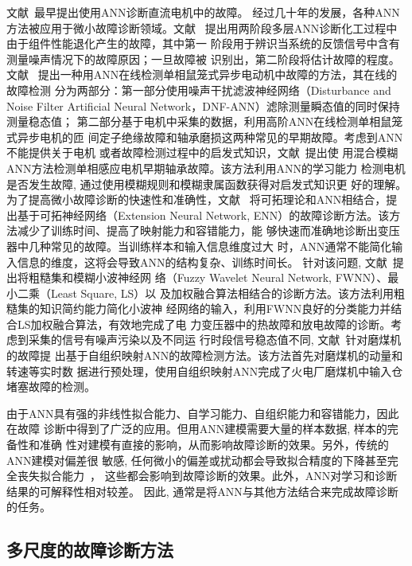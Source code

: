 文献~最早提出使用ANN诊断直流电机中的故障。
经过几十年的发展，各种ANN方法被应用于微小故障诊断领域。文献~
提出用两阶段多层ANN诊断化工过程中由于组件性能退化产生的故障，其中第一
阶段用于辨识当系统的反馈信号中含有测量噪声情况下的故障原因；一旦故障被
识别出，第二阶段将估计故障的程度。文献~
提出一种用ANN在线检测单相鼠笼式异步电动机中故障的方法，其在线的故障检测
分为两部分：第一部分使用噪声干扰滤波神经网络（Disturbance and Noise Filter
Artificial Neural Network，DNF-ANN）滤除测量瞬态值的同时保持测量稳态值；
第二部分基于电机中采集的数据，利用高阶ANN在线检测单相鼠笼式异步电机的匝
间定子绝缘故障和轴承磨损这两种常见的早期故障。考虑到ANN不能提供关于电机
或者故障检测过程中的启发式知识，文献~提出使
用混合模糊ANN方法检测单相感应电机早期轴承故障。该方法利用ANN的学习能力
检测电机是否发生故障, 通过使用模糊规则和模糊隶属函数获得对启发式知识更
好的理解。为了提高微小故障诊断的快速性和准确性，文献~
将可拓理论和ANN相结合，提出基于可拓神经网络（Extension Neural Network,
ENN）的故障诊断方法。该方法减少了训练时间、提高了映射能力和容错能力，能
够快速而准确地诊断出变压器中几种常见的故障。当训练样本和输入信息维度过大
时，ANN通常不能简化输入信息的维度，这将会导致ANN的结构复杂、训练时间长。
针对该问题, 文献~提出将粗糙集和模糊小波神经网
络（Fuzzy Wavelet Neural Network, FWNN）、最小二乘（Least Square, LS）以
及加权融合算法相结合的诊断方法。该方法利用粗糙集的知识简约能力简化小波神
经网络的输入，利用FWNN良好的分类能力并结合LS加权融合算法，有效地完成了电
力变压器中的热故障和放电故障的诊断。考虑到采集的信号有噪声污染以及不同运
行时段信号稳态值不同, 文献~针对磨煤机的故障提
出基于自组织映射ANN的故障检测方法。该方法首先对磨煤机的动量和转速等实时数
据进行预处理，使用自组织映射ANN完成了火电厂磨煤机中输入仓堵塞故障的检测。

由于ANN具有强的非线性拟合能力、自学习能力、自组织能力和容错能力，因此在故障
诊断中得到了广泛的应用。但用ANN建模需要大量的样本数据, 样本的完备性和准确
性对建模有直接的影响，从而影响故障诊断的效果。另外，传统的ANN建模对偏差很
敏感, 任何微小的偏差或扰动都会导致拟合精度的下降甚至完全丧失拟合能力~\cite{zhangzhengdao2004ann}，
这些都会影响到故障诊断的效果。此外，ANN对学习和诊断结果的可解释性相对较差。
因此, 通常是将ANN与其他方法结合来完成故障诊断的任务。

\subsection{多尺度的故障诊断方法}
\label{subsection:multiscale_methods}

